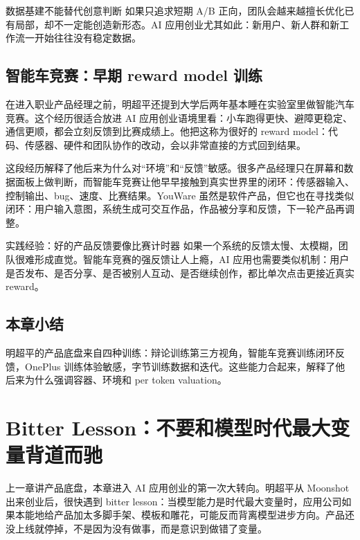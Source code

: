 \documentclass[a4paper]{article}
\begin{document}
\begin{warningbox}{数据基建不能替代创意判断}
如果只追求短期 A/B 正向，团队会越来越擅长优化已有局部，却不一定能创造新形态。AI 应用创业尤其如此：新用户、新人群和新工作流一开始往往没有稳定数据。
\end{warningbox}

\subsection{智能车竞赛：早期 reward model 训练}

在进入职业产品经理之前，明超平还提到大学后两年基本睡在实验室里做智能汽车竞赛。这个经历很适合放进 AI 应用创业语境里看：小车跑得更快、避障更稳定、通信更顺，都会立刻反馈到比赛成绩上。他把这称为很好的 reward model：代码、传感器、硬件和团队协作的改动，会以非常直接的方式回到结果。

这段经历解释了他后来为什么对“环境”和“反馈”敏感。很多产品经理只在屏幕和数据面板上做判断，而智能车竞赛让他早早接触到真实世界里的闭环：传感器输入、控制输出、bug、速度、比赛结果。YouWare 虽然是软件产品，但它也在寻找类似闭环：用户输入意图，系统生成可交互作品，作品被分享和反馈，下一轮产品再调整。

\begin{importantbox}{实践经验：好的产品反馈要像比赛计时器}
如果一个系统的反馈太慢、太模糊，团队很难形成直觉。智能车竞赛的强反馈让人上瘾，AI 应用也需要类似机制：用户是否发布、是否分享、是否被别人互动、是否继续创作，都比单次点击更接近真实 reward。
\end{importantbox}

\subsection{本章小结}

明超平的产品底盘来自四种训练：辩论训练第三方视角，智能车竞赛训练闭环反馈，OnePlus 训练体验敏感，字节训练数据和迭代。这些能力合起来，解释了他后来为什么强调容器、环境和 per token valuation。

\section{Bitter Lesson：不要和模型时代最大变量背道而驰}

上一章讲产品底盘，本章进入 AI 应用创业的第一次大转向。明超平从 Moonshot 出来创业后，很快遇到 bitter lesson：当模型能力是时代最大变量时，应用公司如果本能地给产品加太多脚手架、模板和雕花，可能反而背离模型进步方向。产品还没上线就停掉，不是因为没有做事，而是意识到做错了变量。
\end{document}
